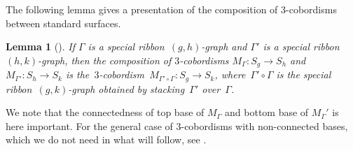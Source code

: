 \documentclass[10pt,a4paper]{amsart}
\numberwithin{equation}{section}
\newtheorem{Lemma}[Theorem]{Lemma}
\newcommand{\co}{\colon}
\newcommand{\RomanNumeralCaps}[1]
{\MakeUppercase{\romannumeral #1}}
\begin{document}
The following lemma gives a presentation of the composition of 3-cobordisms between standard surfaces.
\begin{Lemma}[{\cite[Section~\RomanNumeralCaps{4}.2.3]{turaevqinvariants}}]\label{naivecompo}
If $\Gamma$ is a special ribbon~$(g,h)$-graph and $\Gamma'$ is a special ribbon~$(h,k)$-graph, then the composition of $3$-cobordisms $M_\Gamma \co S_g \to S_h$ and $M_{\Gamma'} \co S_{h} \to S_{k}$ is the~$3$-cobordism~$M_{\Gamma'\circ \Gamma} \co S_{g} \to S_{k}$, where~$\Gamma'\circ \Gamma$ is the special ribbon~$(g,k)$-graph obtained by stacking~$\Gamma'$ over~$\Gamma$.
\end{Lemma}
We note that the connectedness of top base of $M_\Gamma$ and bottom base of $M_\Gamma'$ is here important. For the general case of $3$-cobordisms with non-connected bases, which we do not need in what will follow, see \cite[Section~IV.2.8]{turaevqinvariants}.
\end{document}
